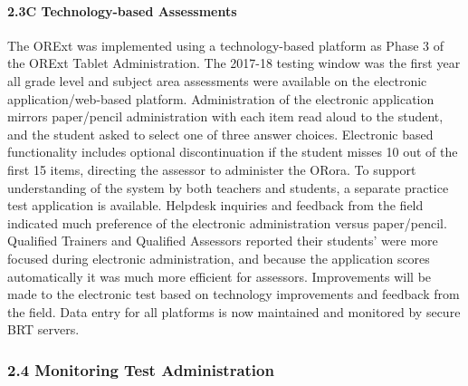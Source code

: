 \documentclass[]{article}
\let\oldparagraph\paragraph
\renewcommand{\paragraph}[1]{\oldparagraph{#1}\mbox{}}
\begin{document}
\hypertarget{c-technology-based-assessments}{%
\paragraph{2.3C Technology-based
Assessments}\label{c-technology-based-assessments}}

The ORExt was implemented using a technology-based platform as Phase 3
of the ORExt Tablet Administration. The 2017-18 testing window was the
first year all grade level and subject area assessments were available
on the electronic application/web-based platform. Administration of the
electronic application mirrors paper/pencil administration with each
item read aloud to the student, and the student asked to select one of
three answer choices. Electronic based functionality includes optional
discontinuation if the student misses 10 out of the first 15 items,
directing the assessor to administer the ORora. To support understanding
of the system by both teachers and students, a separate practice test
application is available. Helpdesk inquiries and feedback from the field
indicated much preference of the electronic administration versus
paper/pencil. Qualified Trainers and Qualified Assessors reported their
students' were more focused during electronic administration, and
because the application scores automatically it was much more efficient
for assessors. Improvements will be made to the electronic test based on
technology improvements and feedback from the field. Data entry for all
platforms is now maintained and monitored by secure BRT servers.

\hypertarget{monitoring-test-administration}{%
\subsubsection{2.4 Monitoring Test
Administration}\label{monitoring-test-administration}}
\end{document}
